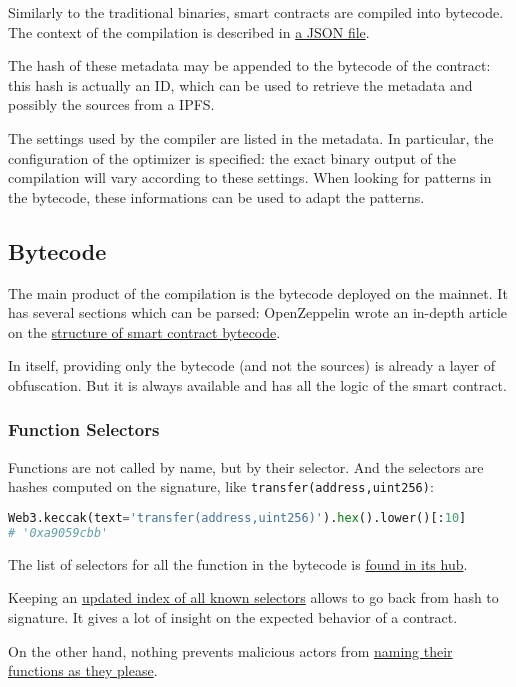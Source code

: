 Similarly to the traditional binaries, smart contracts are compiled into bytecode.
The context of the compilation is described in \href{\urldocssoliditymetadata}{a JSON file}. 

The hash of these metadata may be appended to the bytecode of the contract:
this hash is actually an ID, which can be used to retrieve the metadata and possibly the sources from a IPFS.

The settings used by the compiler are listed in the metadata.
In particular, the configuration of the optimizer is specified: the exact binary output of the compilation will vary according to these settings.
When looking for patterns in the bytecode, these informations can be used to adapt the patterns.

\subsection{Bytecode}

The main product of the compilation is the bytecode deployed on the mainnet.
It has several sections which can be parsed: OpenZeppelin wrote an in-depth article on the \href{\urldiagrambytecode}{structure of smart contract bytecode}.

In itself, providing only the bytecode (and not the sources) is already a layer of obfuscation.
But it is always available and has all the logic of the smart contract.

\subsubsection{Function Selectors}

Functions are not called by name, but by their selector.
And the selectors are hashes computed on the signature, like \lstinline[language=Solidity]{transfer(address,uint256)}:

\begin{lstlisting}[language=Python]
Web3.keccak(text='transfer(address,uint256)').hex().lower()[:10]
# '0xa9059cbb'
\end{lstlisting}

The list of selectors for all the function in the bytecode is \href{\urldiagrambytecode}{found in its hub}.

Keeping an \href{\urlwebindexselectors}{updated index of all known selectors} allows to go back from hash to signature.
It gives a lot of insight on the expected behavior of a contract.

On the other hand, nothing prevents malicious actors from \href{https://www.4byte.directory/signatures/?bytes4_signature=0xa9059cbb}{naming their functions as they please}.


